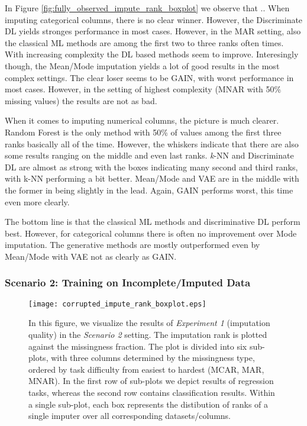 In Figure \ref{fig:fully_observed_impute_rank_boxplot} we observe that ..
When imputing categorical columns, there is no clear winner. However, the Discriminate DL yields stronges performance in most cases. However, in the MAR setting, also the classical ML methods are among the first two to three ranks often times. With increasing complexity the DL based methods seem to improve. Interesingly though, the Mean/Mode imputation yields a lot of good results in the most complex settings.
The clear loser seems to be GAIN, with worst performance in most cases. However, in the setting of highest complexity (MNAR with 50\% missing values) the results are not as bad.

When it comes to imputing numerical columns, the picture is much clearer. Random Forest is the only method with 50\% of values among the first three ranks basically all of the time. However, the whiskers indicate that there are also some results ranging on the middle and even last ranks. \textit{k}-NN and Discriminate DL are almost as strong with the boxes indicating many second and third ranks, with k-NN performing a bit better. Mean/Mode and VAE are in the middle with the former in being slightly in the lead. Again, GAIN performs worst, this time even more clearly.

The bottom line is that the classical ML methods and discriminative DL perform best. However, for categorical columns there is often no improvement over Mode imputation. The generative methods are mostly outperformed even by Mean/Mode with VAE not as clearly as GAIN.



\subsubsection{Scenario 2: Training on Incomplete/Imputed Data}


\begin{figure}\centering
    \texttt{[image: corrupted\_impute\_rank\_boxplot.eps]}

    \caption[Scenario 2 Imputation Ranks]{In this figure, we visualize the results of \textit{Experiment 1} (imputation quality) in the \textit{Scenario 2} setting. The imputation rank is plotted against the missingness fraction. The plot is divided into six sub-plots, with three columns determined by the missingness type, ordered by task difficulty from easiest to hardest (MCAR, MAR, MNAR). In the first row of sub-plots we depict results of regression tasks, whereas the second row contains classification results. Within a single sub-plot, each box represents the distibution of ranks of a single imputer over all corresponding datasets/columns.
    }
	\label{fig:corrupted_impute_rank_boxplot}
\end{figure}

